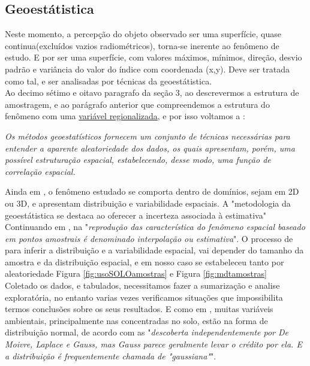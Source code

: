 \subsection{Geoestátistica}
  \hspace*{1.25 cm}  Neste momento, a percepção do objeto observado ser uma superfície, quase continua(excluídos vazios radiométricos), torna-se inerente ao fenômeno de estudo. E por ser uma superfície, com valores máximos, mínimos, direção, desvio padrão e variância do valor do índice com coordenada (x,y). Deve ser tratada como tal, e ser analisadas  por técnicas da geoestátistica.   \\
  \hspace*{1.25 cm}  Ao decimo sétimo e oitavo paragrafo da seção 3, ao descrevermos a estrutura de amostragem, e ao parágrafo anterior  que  compreendemos a estrutura do fenômeno com uma \underline{variável regionalizada}, e por isso voltamos a  \cite[p.10]{Yamamoto} :
\begin{quoting}[rightmargin=0cm,leftmargin=4cm]
	\begin{singlespace}
		{
			\textit{Os métodos geoestatísticos fornecem um conjunto de técnicas necessárias para entender a aparente aleatoriedade dos dados, os quais apresentam, porém, uma possível estruturação espacial, estabelecendo, desse modo, uma função de correlação espacial.}
		}
	\end{singlespace}
\end{quoting} 
 \hspace*{1.25 cm} Ainda em  \cite[p.19 e 20]{Yamamoto}, o fenômeno estudado se comporta dentro de domínios, sejam em 2D ou 3D, e apresentam distribuição e variabilidade espaciais. A "metodologia da geoestátistica se destaca ao oferecer a incerteza associada à estimativa" \\
  \hspace*{1.25 cm} Continuando em  \cite[p.20 e 21]{Yamamoto}, na "\textit{reprodução das característica do fenômeno espacial baseado em pontos amostrais é denominado interpolação ou estimativa}". O processo de para inferir a distribuição e a variabilidade espacial, vai  depender do tamanho da amostra e da distribuição espacial, e em nosso caso se estabeleceu tanto por aleatoriedade Figura \ref{fig:usoSOLOamostras} e Figura \ref{fig:mdtamostras} \\
  \hspace*{1.25 cm}  Coletado os dados, e tabulados, necessitamos fazer a sumarização e analise exploratória,  no entanto varias vezes verificamos  situações que impossibilita termos conclusões sobre os seus resultados. E como em  \cite[p.18]{Webster}, muitas variáveis ambientais, principalmente nas  concentradas no solo, estão na forma de distribuição normal, de acordo com as "\textit{descoberta independentemente por De Moivre, Laplace e Gauss, mas Gauss parece geralmente levar o crédito por ela. E a distribuição é frequentemente chamada de "gaussiana"}". \\
